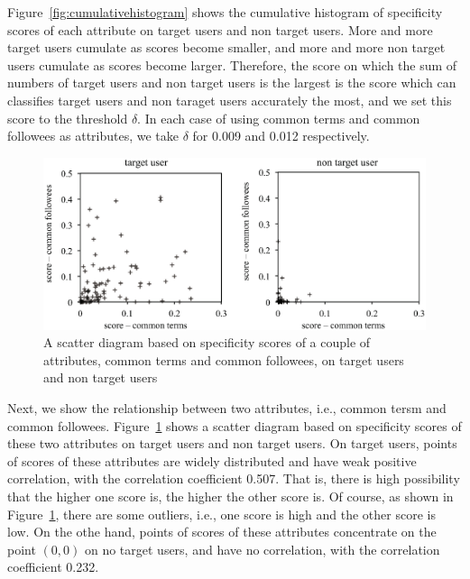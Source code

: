 Figure~\ref{fig:cumulativehistogram} shows the cumulative histogram of
specificity scores of each attribute on target users and non target
users.  More and more target users cumulate as scores become smaller,
and more and more non target users cumulate as scores become larger.
Therefore, the score on which the sum of numbers of target users and non
target users is the largest is the score which can classifies target
users and non taraget users accurately the most, and we set this score
to the threshold $\delta$.  In each case of using common terms and
common followees as attributes, we take $\delta$ for 0.009 and 0.012
respectively.

{\footnotesize
\begin{figure}[t]
\begin{center}
\includegraphics[width=14cm]{images/distribution.eps}
 \caption{A scatter diagram based on specificity scores of a couple of
 attributes, common terms and common followees, on target users and non
 target users}
\label{fig:distribution}
\end{center}
\end{figure}
}

Next, we show the relationship between two attributes, i.e., common
tersm and common followees.  Figure~\ref{fig:distribution} shows a
scatter diagram based on specificity scores of these two attributes on
target users and non target users.  On target users, points of scores of
these attributes are widely distributed and have weak positive
correlation, with the correlation coefficient 0.507.  That is, there is
high possibility that the higher one score is, the higher the other
score is.  Of course, as shown in Figure~\ref{fig:distribution}, there
are some outliers, i.e., one score is high and the other score is low.
On the othe hand, points of scores of these attributes concentrate on
the point $(0, 0)$ on no target users, and have no correlation, with the
correlation coefficient 0.232.

